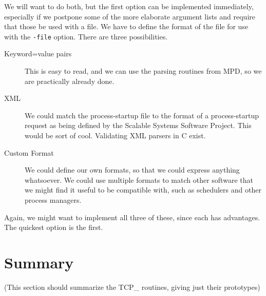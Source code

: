 \documentclass{article}
\def\code#1{\texttt{#1}}
\begin{document}
We will want to do both, but the first option can be implemented
immediately, especially if we postpone some of the more elaborate argument
lists and require that those be used with a file.  We have to define the
format of the file for use with the \code{-file} option.  There are three
possibilities.
\begin{description}
\item[Keyword=value pairs] This is easy to read, and we can use the
  parsing routines from MPD, so we are practically already done.
\item[XML] We could match the process-startup file to the format of a
  process-startup request as being defined by the Scalable Systems Software
  Project.  This would be sort of cool.  Validating XML parsers in C exist.
\item[Custom Format] We could define our own formats, so that we could express
  anything whatsoever.  We could use multiple formats to match other software
  that we might find it useful to be compatible with, such as schedulers and
  other process managers.
\end{description}

Again, we might want to implement all three of these, since each has
advantages.  The quickest option is the first.


\section{Summary}
\label{sec:tcpadi-summary}
(This section should summarize the TCP\_ routines, giving just their prototypes)
\end{document}
